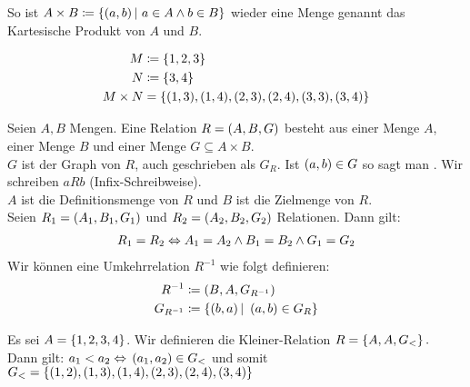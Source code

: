 \begin{definition}
    So ist $A \times B \coloneqq \left\{\left(a,b\right)|~a\in A \land b \in B\right\}$ wieder eine Menge genannt das Kartesische Produkt von $A$ und $B$.
\end{definition}

\begin{beispiel}
    \begin{align*}
        M &\coloneqq \left\{1,2,3\right\}\\
        N &\coloneqq \left\{3,4\right\}\\
        M\times N &= \left\{(1,3), (1,4), (2,3), (2,4), (3,3), (3,4)\right\}
    \end{align*}
\end{beispiel}


\begin{definition}[Relation]
    Seien $A, B$ Mengen. Eine Relation $R=\left(A, B, G\right)$ besteht aus einer Menge $A$, einer Menge $B$ und einer Menge $G\subseteq A\times B$.\\
    $G$ ist der Graph von $R$, auch geschrieben als $G_R$.
    Ist $\left(a,b\right)\in G$ so sagt man . Wir schreiben $aRb$ (Infix-Schreibweise).\\
    $A$ ist die Definitionsmenge von $R$ und $B$ ist die Zielmenge von $R$.\\[10pt]
    Seien $R_1 = \left(A_1, B_1, G_1\right)$ und $R_2 = \left(A_2, B_2, G_2\right)$ Relationen. Dann gilt:
    \begin{align*}
        R_1 = R_2 \Leftrightarrow{} A_1 = A_2 \land B_1 = B_2 \land G_1 = G_2
    \end{align*}
    Wir können eine Umkehrrelation $R^{-1}$ wie folgt definieren:
    \begin{align*}
        R^{-1} &\coloneqq \left(B,A,G_{R^{-1}}\right)\\
        G_{R^{-1}} &\coloneqq \left\{\left(b,a\right) |~\left(a,b\right) \in G_R\right\}
    \end{align*}
\end{definition}

\begin{beispiel}
    Es sei $A = \left\{1,2,3,4\right\}$. Wir definieren die Kleiner-Relation $R=\left\{A, A, G_{<}\right\}.$\\
    Dann gilt: $a_1 < a_2 \Leftrightarrow{} \left(a_1, a_2\right) \in G_{<}$ und somit $G_{<} = \left\{(1,2), (1,3), (1,4), (2,3), (2,4), (3,4)\right\}$
\end{beispiel}


